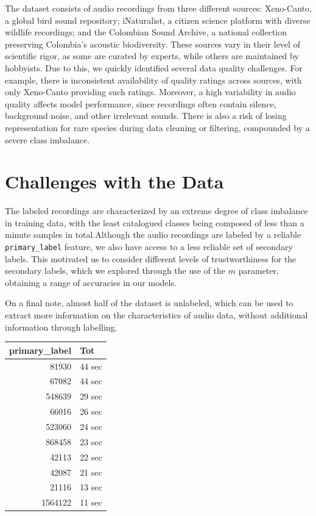 \documentclass[11pt]{article}
\begin{document}
The dataset consists of audio recordings from three different sources: Xeno-Canto, a global bird sound repository; iNaturalist, a citizen science platform with diverse wildlife recordings; and the Colombian Sound Archive, a national collection preserving Colombia's acoustic biodiversity. These sources vary in their level of scientific rigor, as some are curated by experts, while others are maintained by hobbyists. Due to this, we quickly identified several data quality challenges. For example, there is inconsistent availability of quality ratings across sources, with only Xeno-Canto providing such ratings. Moreover, a high variability in audio quality affects model performance, since recordings often contain silence, background noise, and other irrelevant sounds. There is also a risk of losing representation for rare species during data cleaning or filtering, compounded by a severe class imbalance.

\section*{Challenges with the Data}

\begin{minipage}{0.7\linewidth}
  The labeled recordings are characterized by an extreme degree of class imbalance in training data, with the least catalogued classes being composed of less than a minute samples in total.Although the audio recordings are labeled by a reliable \texttt{primary\_label} feature, we also have access to a less reliable set of secondary labels. This motivated us to consider different levels of trustworthiness for the secondary labels, which we explored through the use of the $m$ parameter, obtaining a range of accuracies in our models.

  On a final note, almost half of the dataset is unlabeled, which can be used to extract more information on the characteristics of audio data, without additional information through labelling.
\end{minipage}
\hfill
\begin{minipage}{0.3\linewidth}
  \centering
  \begin{tabular}{|r|l|}
    \hline
    \textbf{primary\_label} & \textbf{Tot} \\
    \hline
    81930    & 44 sec \\
    67082    & 44 sec \\
    548639   & 29 sec \\
    66016    & 26 sec \\
    523060   & 24 sec \\
    868458   & 23 sec \\
    42113    & 22 sec \\
    42087    & 21 sec \\
    21116    & 13 sec \\
    1564122  & 11 sec \\
    \hline
  \end{tabular}
\end{minipage}
\end{document}
